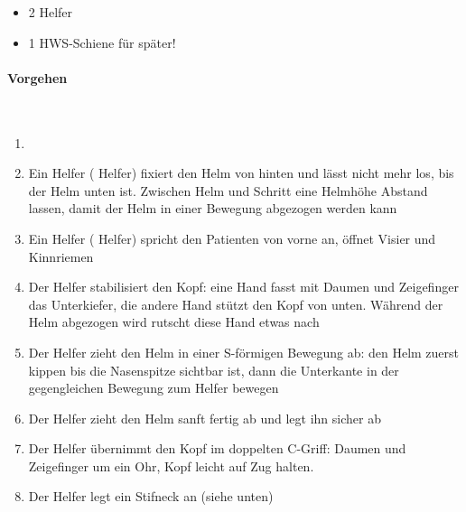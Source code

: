 \begin{itemize}
\item 2 Helfer
\item 1 HWS-Schiene für später!
\end{itemize}

\paragraph*{Vorgehen}~

\begin{enumerate}
    \item {}
    \item Ein Helfer ( Helfer) fixiert den Helm von hinten und lässt nicht mehr los,
    bis der Helm unten ist. Zwischen Helm und Schritt eine Helmhöhe
    Abstand lassen, damit der Helm in einer Bewegung abgezogen werden kann
    \item Ein Helfer ( Helfer) spricht den Patienten von vorne an, öffnet Visier und
    Kinnriemen
    \item Der  Helfer stabilisiert den Kopf: eine Hand fasst mit
    Daumen und Zeigefinger das Unterkiefer, die andere Hand stützt den
    Kopf von unten. Während der Helm abgezogen wird rutscht diese Hand
    etwas nach
    \item Der  Helfer zieht den Helm in einer S-förmigen Bewegung
    ab: den Helm zuerst kippen bis die Nasenspitze sichtbar ist, dann die
    Unterkante in der gegengleichen Bewegung zum Helfer bewegen
    \item Der  Helfer zieht den Helm sanft fertig ab und legt ihn
    sicher ab
    \item Der  Helfer übernimmt den Kopf im doppelten C-Griff:
    Daumen und Zeigefinger um ein Ohr, Kopf leicht auf Zug halten.
    \item Der  Helfer legt ein Stifneck an (siehe unten)
\end{enumerate}

